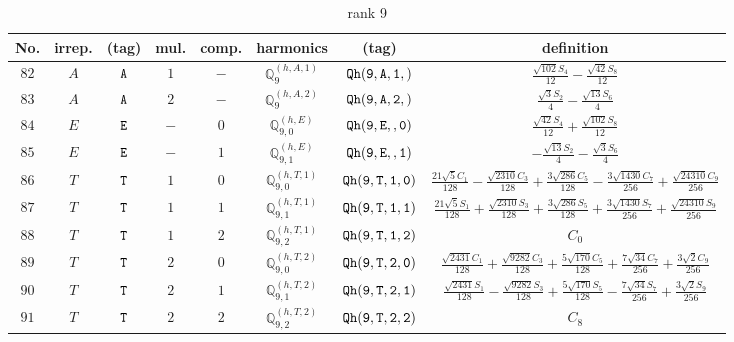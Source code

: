 \documentclass[fleqn,8pt]{jsarticle}
\begin{document}
\begin{table}[ht!]
\begin{center}
\caption{rank 9}
\renewcommand{\arraystretch}{1.3}
\begin{tabular}{cccccccc} \hline \hline
No. & irrep. & (tag) & mul. & comp. & harmonics & (tag) & definition \\ \hline
$ 82 $ & $ A $ & $ {\tt A} $ & $ 1 $ & $ - $ & $ \mathbb{Q}_{9}^{(h,A,1)} $ & $ {\tt Qh(9,A,1,)} $ & $ \frac{\sqrt{102} S_{4}}{12} - \frac{\sqrt{42} S_{8}}{12} $ \\
$ 83 $ & $ A $ & $ {\tt A} $ & $ 2 $ & $ - $ & $ \mathbb{Q}_{9}^{(h,A,2)} $ & $ {\tt Qh(9,A,2,)} $ & $ \frac{\sqrt{3} S_{2}}{4} - \frac{\sqrt{13} S_{6}}{4} $ \\
$ 84 $ & $ E $ & $ {\tt E} $ & $ - $ & $ 0 $ & $ \mathbb{Q}_{9,0}^{(h,E)} $ & $ {\tt Qh(9,E,,0)} $ & $ \frac{\sqrt{42} S_{4}}{12} + \frac{\sqrt{102} S_{8}}{12} $ \\
$ 85 $ & $ E $ & $ {\tt E} $ & $ - $ & $ 1 $ & $ \mathbb{Q}_{9,1}^{(h,E)} $ & $ {\tt Qh(9,E,,1)} $ & $ - \frac{\sqrt{13} S_{2}}{4} - \frac{\sqrt{3} S_{6}}{4} $ \\
$ 86 $ & $ T $ & $ {\tt T} $ & $ 1 $ & $ 0 $ & $ \mathbb{Q}_{9,0}^{(h,T,1)} $ & $ {\tt Qh(9,T,1,0)} $ & $ \frac{21 \sqrt{5} C_{1}}{128} - \frac{\sqrt{2310} C_{3}}{128} + \frac{3 \sqrt{286} C_{5}}{128} - \frac{3 \sqrt{1430} C_{7}}{256} + \frac{\sqrt{24310} C_{9}}{256} $ \\
$ 87 $ & $ T $ & $ {\tt T} $ & $ 1 $ & $ 1 $ & $ \mathbb{Q}_{9,1}^{(h,T,1)} $ & $ {\tt Qh(9,T,1,1)} $ & $ \frac{21 \sqrt{5} S_{1}}{128} + \frac{\sqrt{2310} S_{3}}{128} + \frac{3 \sqrt{286} S_{5}}{128} + \frac{3 \sqrt{1430} S_{7}}{256} + \frac{\sqrt{24310} S_{9}}{256} $ \\
$ 88 $ & $ T $ & $ {\tt T} $ & $ 1 $ & $ 2 $ & $ \mathbb{Q}_{9,2}^{(h,T,1)} $ & $ {\tt Qh(9,T,1,2)} $ & $ C_{0} $ \\
$ 89 $ & $ T $ & $ {\tt T} $ & $ 2 $ & $ 0 $ & $ \mathbb{Q}_{9,0}^{(h,T,2)} $ & $ {\tt Qh(9,T,2,0)} $ & $ \frac{\sqrt{2431} C_{1}}{128} + \frac{\sqrt{9282} C_{3}}{128} + \frac{5 \sqrt{170} C_{5}}{128} + \frac{7 \sqrt{34} C_{7}}{256} + \frac{3 \sqrt{2} C_{9}}{256} $ \\
$ 90 $ & $ T $ & $ {\tt T} $ & $ 2 $ & $ 1 $ & $ \mathbb{Q}_{9,1}^{(h,T,2)} $ & $ {\tt Qh(9,T,2,1)} $ & $ \frac{\sqrt{2431} S_{1}}{128} - \frac{\sqrt{9282} S_{3}}{128} + \frac{5 \sqrt{170} S_{5}}{128} - \frac{7 \sqrt{34} S_{7}}{256} + \frac{3 \sqrt{2} S_{9}}{256} $ \\
$ 91 $ & $ T $ & $ {\tt T} $ & $ 2 $ & $ 2 $ & $ \mathbb{Q}_{9,2}^{(h,T,2)} $ & $ {\tt Qh(9,T,2,2)} $ & $ C_{8} $ \\

\end{tabular}
\end{center}
\end{table}
\end{document}
